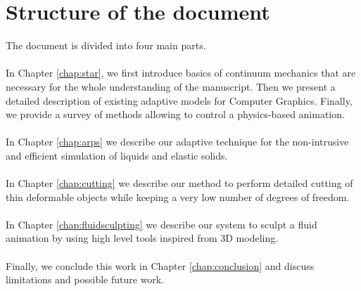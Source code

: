 \section{Structure of the document}
The document is divided into four main parts. \\ \\
In Chapter \ref{chap:star}, we first introduce basics of continuum mechanics that are necessary for the whole understanding of the manuscript. Then we present a detailed description of existing adaptive models for Computer Graphics. Finally, we provide a survey of methods allowing to control a physics-based animation. \\ \\
In Chapter \ref{chap:arps} we describe our adaptive technique for the non-intrusive and efficient simulation of liquids and elastic solids. \\ \\
In Chapter \ref{chap:cutting} we describe our method to perform detailed cutting of thin deformable objects while keeping a very low number of degrees of freedom.  \\ \\
In Chapter \ref{chap:fluidsculpting} we describe our system to sculpt  a fluid animation by using high level tools inspired from 3D modeling. \\ \\
Finally, we conclude this work in Chapter \ref{chap:conclusion} and discuss limitations and possible future work.

